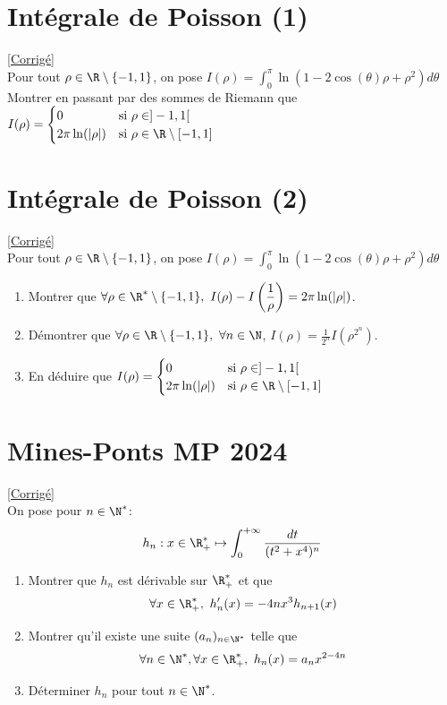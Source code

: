 \documentclass{book}
\begin{document}
	\section{Intégrale de Poisson (1) }
	\textcolor{blue}{\hyperref[sec:integrale-de-poisson-1-etoile2]{[Corrigé]}}\\
	\label{intpoisson1}
	\label{Intégrale de Poisson 1}
	Pour tout $\rho \in \R\setminus\{-1,1\}$, on pose $I(\rho)=\displaystyle\int_0^\pi \ln(1-2\cos(\theta)\rho+\rho^2)d\theta$\\
	Montrer en passant par des sommes de Riemann que $I(\rho)=\begin{cases}
		0 & \mbox{si} \ \rho \in ]-1,1[\\
		2\pi \ln(|\rho|) & \mbox{si} \ \rho \in \R\setminus[-1,1]
	\end{cases}$
	
	\section{Intégrale de Poisson (2) }
	\textcolor{blue}{\hyperref[sec:integrale-de-poisson-2-etoile3]{[Corrigé]}}\\
	\label{intpoisson2}
	\label{Intégrale de Poisson 2}
	Pour tout $\rho \in \R\setminus\{-1,1\}$, on pose $I(\rho)=\displaystyle\int_0^\pi \ln(1-2\cos(\theta)\rho+\rho^2)d\theta$
	\begin{enumerate}[leftmargin=*]
		\item Montrer que $\forall \rho\in \R^*\setminus\{-1,1\},\ I(\rho)-I\left(\displaystyle\frac{1}{\rho}\right)=2\pi\ln(|\rho|)$.
		\item Démontrer que $\forall \rho\in \R\setminus\{-1,1\},\ \forall n \in \N$, $I(\rho)=\displaystyle\frac{1}{2^n}I\left(\rho^{2^n}\right)$.
		\item En déduire que $I(\rho)=\begin{cases}
			0 & \mbox{si} \ \rho \in ]-1,1[\\
			2\pi \ln(|\rho|) & \mbox{si} \ \rho \in \R\setminus[-1,1]
		\end{cases}$
	\end{enumerate}
	
	\section{Mines-Ponts MP 2024}
	\textcolor{blue}{\hyperref[sec:mines-ponts-mp-2024-chaima-prime]{[Corrigé]}}\\
	\label{chaima}
	\label{Mines-Ponts MP 2024}
	On pose pour $n\in\N^*$: $$h_n:x\in \R_+^*\mapsto\int_0^{+\infty}\frac{dt}{(t^2+x^4)^n}$$
	\begin{enumerate}
		\item Montrer que $h_n$ est dérivable sur $\R^*_+$ et que $$\forall x\in\R^*_+,\ h_n'(x)=-4nx^3h_{n+1}(x)$$
		\item Montrer qu'il existe une suite $(a_n)_{n\in\N^*}$ telle que $$\forall n\in\N^*,\forall x\in\R^*_+,\ h_n(x)=a_nx^{2-4n}$$
		\item Déterminer $h_n$ pour tout $n\in\N^*$.
	\end{enumerate}
	
\end{document}
